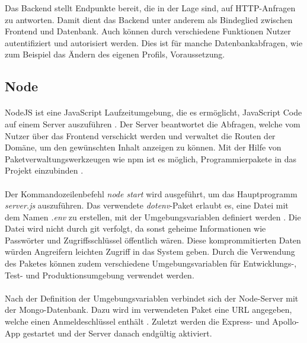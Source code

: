 Das Backend stellt Endpunkte bereit, die in der Lage sind, auf HTTP-Anfragen zu antworten.
Damit dient das Backend unter anderem als Bindeglied zwischen Frontend und Datenbank.
Auch können durch verschiedene Funktionen Nutzer autentifiziert und autorisiert werden.
Dies ist für manche Datenbankabfragen, wie zum Beispiel das Ändern des eigenen Profils, Voraussetzung.

\subsection{Node}
\paragraph{}
NodeJS ist eine JavaScript Laufzeitumgebung, die es ermöglicht, JavaScript Code auf einem Server auszuführen \cite{be:node}.
Der Server beantwortet die Abfragen, welche vom Nutzer über das Frontend verschickt werden und verwaltet die Routen der Domäne, um den gewünschten Inhalt anzeigen zu können.
Mit der Hilfe von Paketverwaltungswerkzeugen wie npm ist es möglich, Programmierpakete in das Projekt einzubinden \cite{be:npm}.\\

\paragraph{}
Der Kommandozeilenbefehl \textit{node start} wird ausgeführt, um das Hauptprogramm \textit{server.js} auszuführen.
Das verwendete \textit{dotenv}-Paket erlaubt es, eine Datei mit dem Namen \textit{.env} zu erstellen, mit der Umgebungsvariablen definiert werden \cite{be:dotenv}.
Die Datei wird nicht durch git verfolgt, da sonst geheime Informationen wie Passwörter und Zugriffsschlüssel öffentlich wären.
Diese komprommitierten Daten würden Angreifern leichten Zugriff in das System geben.
Durch die Verwendung des Paketes können zudem verschiedene Umgebungsvariablen für Entwicklungs-, Test- und Produktionsumgebung verwendet werden.\cite{be:dotenv2}\\

\paragraph{}
Nach der Definition der Umgebungsvariablen verbindet sich der Node-Server mit der Mongo-Datenbank.
Dazu wird im verwendeten Paket  eine URL angegeben, welche einen Anmeldeschlüssel enthält \cite{be:mongoose}.
Zuletzt werden die Express- und Apollo-App gestartet und der Server danach endgültig aktiviert.

